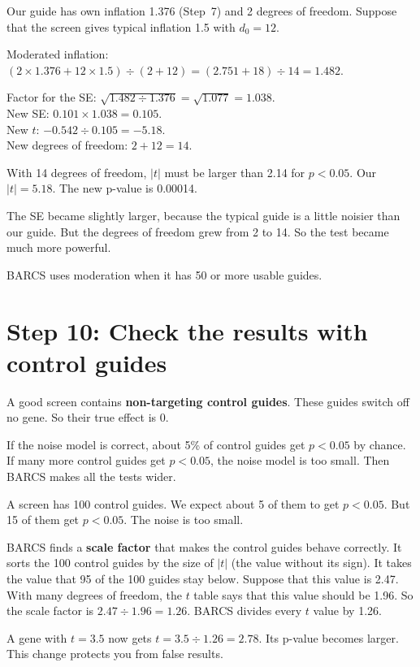 \documentclass[12pt]{article}
\begin{document}
\begin{worked}
Our guide has own inflation 1.376 (Step~7) and 2 degrees of freedom.
Suppose that the screen gives typical inflation 1.5 with $d_0 = 12$.

Moderated inflation: $(2 \times 1.376 + 12 \times 1.5) \div (2 + 12)
 = (2.751 + 18) \div 14 = 1.482$.

Factor for the SE: $\sqrt{1.482 \div 1.376} = \sqrt{1.077} = 1.038$.\\
New SE: $0.101 \times 1.038 = 0.105$.\\
New $t$: $-0.542 \div 0.105 = -5.18$.\\
New degrees of freedom: $2 + 12 = 14$.

With 14 degrees of freedom, $|t|$ must be larger than 2.14 for
$p < 0.05$. Our $|t| = 5.18$. The new p-value is 0.00014.

The SE became slightly larger, because the typical guide is a little noisier
than our guide. But the degrees of freedom grew from 2 to 14. So the test
became much more powerful.
\end{worked}

BARCS uses moderation when it has 50 or more usable guides.
\section{Step 10: Check the results with control guides}

A good screen contains \textbf{non-targeting control guides}. These guides
switch off no gene. So their true effect is 0.

If the noise model is correct, about 5\% of control guides get
$p < 0.05$ by chance. If many more control guides get $p < 0.05$, the noise
model is too small. Then BARCS makes all the tests wider.

\begin{worked}
A screen has 100 control guides. We expect about 5 of them to get
$p < 0.05$. But 15 of them get $p < 0.05$. The noise is too small.

BARCS finds a \textbf{scale factor} that makes the control guides behave
correctly. It sorts the 100 control guides by the size of $|t|$ (the value
without its sign). It takes the value that 95 of the 100 guides stay below.
Suppose that this value is 2.47. With many degrees of freedom, the $t$ table
says that this value should be 1.96. So the scale factor is
$2.47 \div 1.96 = 1.26$. BARCS divides every $t$ value by 1.26.

A gene with $t = 3.5$ now gets $t = 3.5 \div 1.26 = 2.78$. Its p-value
becomes larger. This change protects you from false results.
\end{worked}
\end{document}
